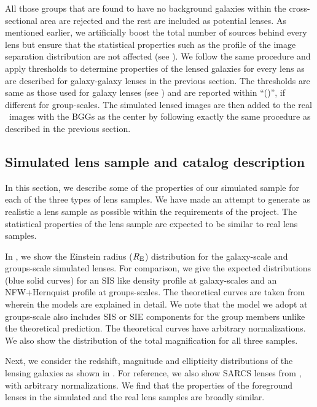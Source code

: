 \documentclass[useAMS,usenatbib,a4paper]{mn2e}
\begin{document}
All those groups that are found to have no background galaxies within the
cross-sectional area are rejected and the rest are included as potential lenses.
As mentioned earlier, we artificially boost the total number of sources behind
every lens but ensure that the statistical properties such as the profile of the
image separation distribution are not affected (see ). We
follow the same procedure and apply thresholds to determine properties
of the lensed galaxies for every lens as are described for galaxy-galaxy lenses
in the previous section. The thresholds are same as those used for
galaxy lenses (see ) and are reported within ``()'', if
different for group-scales. The simulated lensed images are then added
to the real \cfhtls~images with the BGGs as the center by following
exactly the same procedure as described in the previous section.


\subsection{Simulated lens sample and catalog description}

In this section, we describe some of the properties of our simulated sample for
each of the three types of lens samples. We have made an attempt to
generate as realistic a lens sample as possible within the requirements
of the \sw project. The statistical properties of the lens sample are
expected to be similar to real lens samples.

In , we show the Einstein radius ($R_{\rm E}$) distribution for the
galaxy-scale and groups-scale simulated lenses. For comparison, we give
the expected distributions (blue solid curves) for an SIS like density
profile at galaxy-scales and an NFW+Hernquist profile at groups-scales.
The theoretical curves are taken from \citet{More2012} wherein the
models are explained in detail. We note that the model we adopt at
groups-scale also includes SIS or SIE components for the group members
unlike the theoretical prediction. The theoretical curves have arbitrary
normalizations. We also show the distribution of the total magnification
for all three samples.

Next, we consider the redshift, magnitude and ellipticity distributions
of the lensing galaxies as shown in . For reference,
we also show SARCS lenses from \citet{More2012}, with arbitrary
normalizations. We find that the properties of the foreground lenses in
the simulated and the real lens samples are broadly similar.
\end{document}
